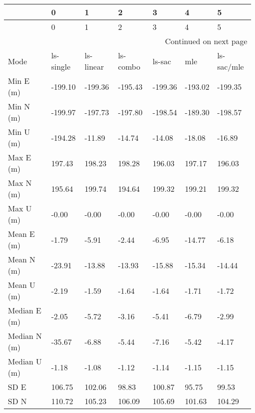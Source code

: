 \begin{longtable}{lllllll}
\toprule
{} &          0 &          1 &         2 &        3 &        4 &           5 \\
\midrule
\endfirsthead

\toprule
{} &          0 &          1 &         2 &        3 &        4 &           5 \\
\midrule
\endhead
\midrule
\multicolumn{7}{r}{{Continued on next page}} \\
\midrule
\endfoot

\bottomrule
\endlastfoot
Mode              &  ls-single &  ls-linear &  ls-combo &   ls-sac &      mle &  ls-sac/mle \\
Min E (m)         &    -199.10 &    -199.36 &   -195.43 &  -199.36 &  -193.02 &     -199.35 \\
Min N (m)         &    -199.97 &    -197.73 &   -197.80 &  -198.54 &  -189.30 &     -198.57 \\
Min U (m)         &    -194.28 &     -11.89 &    -14.74 &   -14.08 &   -18.08 &      -16.89 \\
Max E (m)         &     197.43 &     198.23 &    198.28 &   196.03 &   197.17 &      196.03 \\
Max N (m)         &     195.64 &     199.74 &    194.64 &   199.32 &   199.21 &      199.32 \\
Max U (m)         &      -0.00 &      -0.00 &     -0.00 &    -0.00 &    -0.00 &       -0.00 \\
Mean E (m)        &      -1.79 &      -5.91 &     -2.44 &    -6.95 &   -14.77 &       -6.18 \\
Mean N (m)        &     -23.91 &     -13.88 &    -13.93 &   -15.88 &   -15.34 &      -14.44 \\
Mean U (m)        &      -2.19 &      -1.59 &     -1.64 &    -1.64 &    -1.71 &       -1.72 \\
Median E (m)      &      -2.05 &      -5.72 &     -3.16 &    -5.41 &    -6.79 &       -2.99 \\
Median N (m)      &     -35.67 &      -6.88 &     -5.44 &    -7.16 &    -5.42 &       -4.17 \\
Median U (m)      &      -1.18 &      -1.08 &     -1.12 &    -1.14 &    -1.15 &       -1.15 \\
SD E              &     106.75 &     102.06 &     98.83 &   100.87 &    95.75 &       99.53 \\
SD N              &     110.72 &     105.23 &    106.09 &   105.69 &   101.63 &      104.29 \\

\end{longtable}
